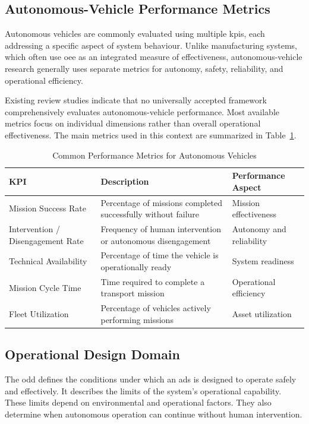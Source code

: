 \subsection{Autonomous-Vehicle Performance Metrics}
Autonomous vehicles are commonly evaluated using multiple \glspl{kpi}, each addressing a specific aspect of system behaviour. Unlike manufacturing systems, which often use \gls{oee} as an integrated measure of effectiveness, autonomous-vehicle research generally uses separate metrics for autonomy, safety, reliability, and operational efficiency.

Existing review studies indicate that no universally accepted framework comprehensively evaluates autonomous-vehicle performance. Most available metrics focus on individual dimensions rather than overall operational effectiveness. The main metrics used in this context are summarized in Table~\ref{tab:av-performance-metrics}.
\begin{table}[H]
\renewcommand{\arraystretch}{1.5}
\centering
\caption{Common Performance Metrics for Autonomous Vehicles}
\label{tab:av-performance-metrics}
\begin{tabular}{|p{3cm}|p{6cm}|p{5cm}|}
\hline
\textbf{KPI} & \textbf{Description} & \textbf{Performance Aspect} \\
\hline
Mission Success Rate & Percentage of missions completed successfully without failure & Mission effectiveness \\
\hline
Intervention / Disengagement Rate & Frequency of human intervention or autonomous disengagement & Autonomy and reliability \\
\hline
Technical Availability & Percentage of time the vehicle is operationally ready & System readiness \\
\hline
Mission Cycle Time & Time required to complete a transport mission & Operational efficiency \\
\hline
Fleet Utilization & Percentage of vehicles actively performing missions & Asset utilization \\
\hline
\end{tabular}
\end{table}
\subsection{Operational Design Domain}
The \gls{odd} defines the conditions under which an \gls{ads} is designed to operate safely and effectively. It describes the limits of the system's operational capability. These limits depend on environmental and operational factors. They also determine when autonomous operation can continue without human intervention.

